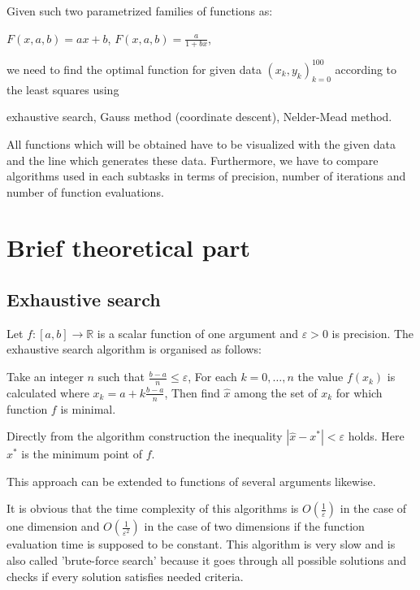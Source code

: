 \documentclass[12pt, bachelor, substylefile = algo_title.rtx]{disser}
\newcommand{\eps}{\varepsilon}
\theoremstyle{definition}
\begin{document}
Given such two parametrized families of functions as:
\begin{outline}[enumerate]
\1 $F(x, a, b) = ax + b$,
\1 $F(x, a, b) = \frac{a}{1+bx}$,
\end{outline}
we need to find the optimal function for given data $(x_k, y_k)_{k = 0}^{100}$ according to the least squares using
\begin{outline}
\1 exhaustive search,
\1 Gauss method (coordinate descent),
\1 Nelder-Mead method.
\end{outline}

All functions which will be obtained have to be visualized with the given data and the line which generates these data. Furthermore, we have to compare algorithms used in each subtasks in terms of precision, number of iterations and number of function evaluations.

\section{Brief theoretical part}
\subsection{Exhaustive search}

Let $f: [a, b] \to \mathbb{R}$ is a scalar function of one argument and $\eps > 0$ is precision. The exhaustive search algorithm is organised as follows:
\begin{outline}[enumerate]
\1 Take an integer $n$ such that $\frac{b-a}{n} \le \eps$,
\1 For each $k = 0,\dots, n$ the value $f(x_k)$ is calculated where $x_k = a + k\frac{b-a}{n}$,
\1 Then find $\widehat{x}$ among the set of $x_k$ for which function $f$ is minimal.
\end{outline}
Directly from the algorithm construction the inequality $|\widehat{x} - x^*| < \eps$ holds. Here $x^*$ is the minimum point of $f$.

This approach can be extended to functions of several arguments likewise.

It is obvious that the time complexity of this algorithms is $O(\frac{1}{\eps})$ in the case of one dimension and $O(\frac{1}{\eps^2})$ in the case of two dimensions if the function evaluation time is supposed to be constant. This algorithm is very slow and is also called 'brute-force search' because it goes through all possible solutions and checks if every solution satisfies needed criteria.
\end{document}
